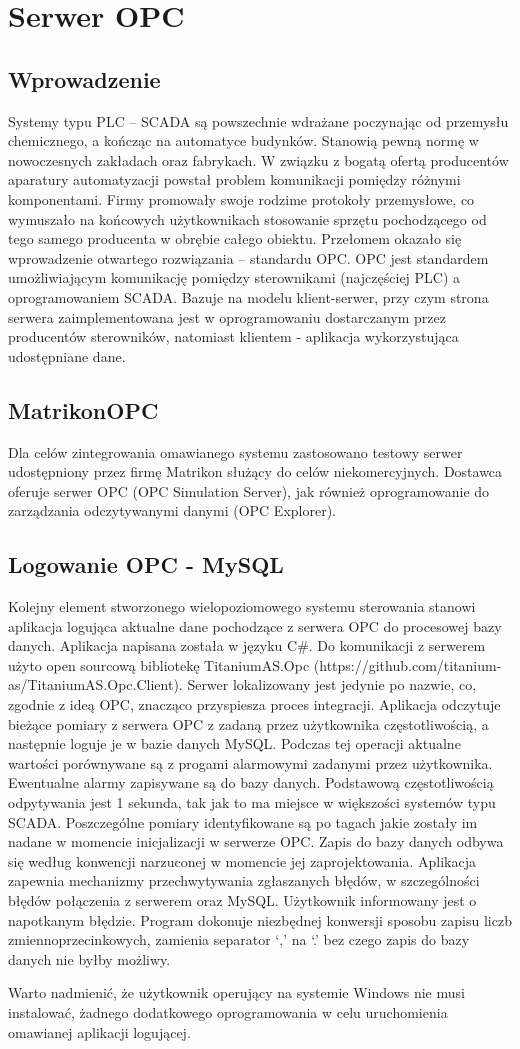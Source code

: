 \section{Serwer OPC}
\subsection{Wprowadzenie}
Systemy typu PLC – SCADA są powszechnie wdrażane poczynając od przemysłu chemicznego, a kończąc na automatyce budynków. Stanowią pewną normę w nowoczesnych zakładach oraz fabrykach. W związku z bogatą ofertą producentów aparatury automatyzacji powstał problem komunikacji pomiędzy różnymi komponentami. Firmy promowały swoje rodzime protokoły przemysłowe, co wymuszało na końcowych użytkownikach stosowanie sprzętu pochodzącego od tego samego producenta w obrębie całego obiektu. Przełomem okazało się wprowadzenie otwartego rozwiązania – standardu OPC. OPC jest standardem umożliwiającym komunikację pomiędzy sterownikami (najczęściej PLC) a oprogramowaniem SCADA. Bazuje na modelu klient-serwer, przy czym strona serwera zaimplementowana jest w oprogramowaniu dostarczanym przez producentów sterowników, natomiast klientem - aplikacja wykorzystująca udostępniane dane. 
\subsection{MatrikonOPC}
Dla celów zintegrowania omawianego systemu zastosowano testowy serwer udostępniony przez firmę Matrikon służący do celów niekomercyjnych. Dostawca oferuje serwer OPC (OPC Simulation Server), jak również oprogramowanie do zarządzania odczytywanymi danymi (OPC Explorer). 
\subsection{Logowanie OPC - MySQL}
Kolejny element stworzonego wielopoziomowego systemu sterowania stanowi aplikacja logująca aktualne dane pochodzące z serwera OPC do procesowej bazy danych. Aplikacja napisana została w języku C\#. Do komunikacji z serwerem użyto open sourcową bibliotekę TitaniumAS.Opc (https://github.com/titanium-as/TitaniumAS.Opc.Client). Serwer lokalizowany jest jedynie po nazwie, co, zgodnie z ideą OPC, znacząco przyspiesza proces integracji. Aplikacja odczytuje bieżące pomiary z serwera OPC z zadaną przez użytkownika częstotliwością, a następnie loguje je w bazie danych MySQL. Podczas tej operacji aktualne wartości porównywane są z progami alarmowymi zadanymi przez użytkownika. Ewentualne alarmy zapisywane są do bazy danych. Podstawową częstotliwością odpytywania jest 1 sekunda, tak jak to ma miejsce w większości systemów typu SCADA. Poszczególne pomiary identyfikowane są po tagach jakie zostały im nadane w momencie inicjalizacji w serwerze OPC. Zapis do bazy danych odbywa się według konwencji narzuconej w momencie jej zaprojektowania. Aplikacja zapewnia mechanizmy przechwytywania zgłaszanych błędów, w szczególności błędów połączenia z serwerem oraz MySQL. Użytkownik informowany jest o napotkanym błędzie. Program dokonuje niezbędnej konwersji sposobu zapisu liczb zmiennoprzecinkowych, zamienia separator ‘,’ na ‘.’ bez czego zapis do bazy danych nie byłby możliwy.
 
Warto nadmienić, że użytkownik operujący na systemie Windows nie musi instalować, żadnego dodatkowego oprogramowania w celu uruchomienia omawianej aplikacji logującej.
